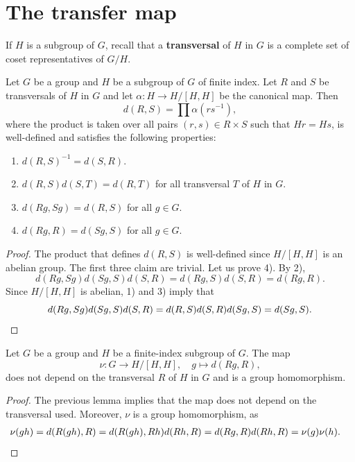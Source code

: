 


\section{The transfer map}

If $H$ is a subgroup of $G$, recall that 
a \textbf{transversal} of $H$ in $G$ is a complete
set of coset representatives of $G/H$. 

\begin{lemma}
	\label{lem:d:transfer}
	Let $G$ be a group and $H$ be a subgroup of $G$ of finite index.  Let $R$
	and $S$ be transversals of $H$ in $G$ and let $\alpha\colon H\to H/[H,H]$
	be the canonical map. Then 
	\[
		d(R,S)=\prod \alpha(rs^{-1}),
	\]
	where the product is taken over all pairs 
	$(r,s)\in R\times S$ such that $Hr=Hs$,
	is well-defined and satisfies the following properties:
	\begin{enumerate}
		\item $d(R,S)^{-1}=d(S,R)$.
		\item $d(R,S)d(S,T)=d(R,T)$ for all transversal $T$ of $H$ in $G$.
		\item $d(Rg,Sg)=d(R,S)$ for all $g\in G$.
		\item $d(Rg,R)=d(Sg,S)$ for all $g\in G$.
	\end{enumerate}
\end{lemma}

\begin{proof}
	The product that defines $d(R,S)$ is well-defined since $H/[H,H]$ is 
	an abelian group. The first three claim are trivial. Let us prove
	4). By 2), 
	\[
		d(Rg,Sg)d(Sg,S)d(S,R)=d(Rg,S)d(S,R)=d(Rg,R).
	\]
	Since $H/[H,H]$ is abelian, 1) and 3) imply that 	
	\[
		d(Rg,Sg)d(Sg,S)d(S,R)=d(R,S)d(S,R)d(Sg,S)=d(Sg,S).\qedhere
	\]
\end{proof}

\begin{theorem}
	\label{thm:transfer}
	Let $G$ be a group and $H$ be a finite-index subgroup of $G$. The map 	
	\[
		\nu\colon G\to H/[H,H],\quad
		g\mapsto d(Rg,R),
	\]
	does not depend on the transversal $R$ of $H$ in $G$ and is a group
	homomorphism. 
\end{theorem}

\begin{proof}
	The previous lemma implies that the map does not depend on the transversal used. 
	Moreover, $\nu$ is a group homomorphism, as 
	\begin{align*}
		\nu(gh)&=d(R(gh),R)
		=d(R(gh),Rh)d(Rh,R)
		=d(Rg,R)d(Rh,R)=\nu(g)\nu(h).\qedhere
	\end{align*}
\end{proof}

